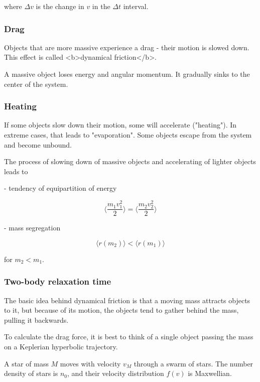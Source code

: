 where $\Delta v$ is the change in $v$ in the $\Delta t$ interval. 

\subsubsection{Drag}

Objects that are more massive experience a drag - their motion is slowed down. This effect is called <b>dynamical friction</b>. 


A massive object loses energy and angular momentum. It gradually sinks to the center of the system. 


\subsubsection{Heating}

If some objects slow down their motion, some will accelerate ("heating"). In extreme cases, that leads to "evaporation". Some objects escape from the system and become unbound. 

The process of slowing down of massive objects and accelerating of lighter objects leads to 

- tendency of equipartition of energy 

\begin{equation}
\langle \frac{m_1v_1^2}{2} \rangle =\langle \frac{m_2v_2^2}{2} \rangle 
\end{equation}

- mass segregation

\begin{equation}
\langle r(m_2) \rangle < \langle r(m_1) \rangle 
\end{equation}

for $m_2 < m_1$. 


\subsubsection{Two-body relaxation time}

The basic idea behind dynamical friction is that a moving mass attracts objects to it, but because of its motion, the objects tend to gather behind the mass, pulling it backwards. 

To calculate the drag force, it is best to think of a single object passing the mass on a Keplerian hyperbolic trajectory.

A star of mass $M$ moves with velocity $v_M$ through a swarm of stars. The number density of stars is $n_0$, and their velocity distribution $f(v)$ is Maxwellian. 

